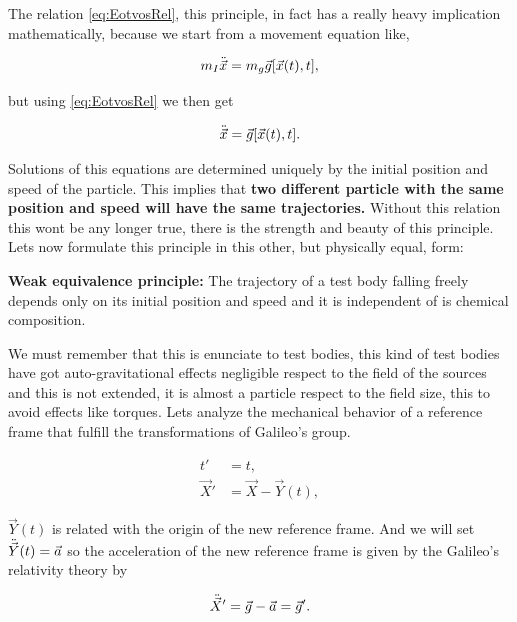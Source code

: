         The relation \ref{eq:EotvosRel}, this principle, in fact has a really heavy implication mathematically, because we start from a movement equation like,

        \begin{equation}
            m_I\Ddot{\Vec{x}} = m_g \Vec{g}[\Vec{x}(t),t],
        \end{equation}

        but using \ref{eq:EotvosRel} we then get

        \begin{equation}
            \Ddot{\Vec{x}} =  \Vec{g}[\Vec{x}(t),t].
        \end{equation}

        Solutions of this equations are determined uniquely by the initial position and speed of the particle. This implies that \textbf{two different particle with the same position and speed will have the same trajectories.} Without this relation this wont be any longer true, there is the strength and beauty of this principle. Lets now formulate this principle in this other, but physically equal, form:

        \begin{myPrinciple}
            \textbf{Weak equivalence principle:} The trajectory of a test body falling freely depends only on its initial position and speed and it is independent of is chemical composition.
        \end{myPrinciple}

        We must remember that this is enunciate to test bodies, this kind of test bodies have got auto-gravitational effects negligible respect to the field of the sources and this is not extended, it is almost a particle respect to the field size, this to avoid effects like torques.  Lets analyze the mechanical behavior of a reference frame that fulfill the transformations of Galileo's group.

        \begin{align}
            t' &= t ,\\
            \Vec{X}' &= \Vec{X} - \Vec{Y}(t),
        \end{align}

        $\Vec{Y}(t)$ is related with the origin of the new reference frame. And we will set $\Ddot{\Vec{Y}}(t) = \Vec{a}$ so the acceleration of the new reference frame is given by the Galileo's relativity theory by

        \begin{equation}\label{eq: xdobleprim}
            \Ddot{\Vec{X}}' = \Vec{g} - \Vec{a} = \Vec{g}'.
        \end{equation}

